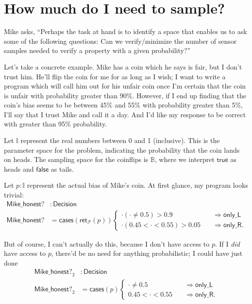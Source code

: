 \documentclass{article}           %
\newcommand{\bool}{\mathbb{B}}
\newcommand{\Prob}{\mathcal{P}}
\newcommand{\ret}[1]{\mathsf{ret}_{#1}}
\begin{document}
\section{How much do I need to sample?}

Mike asks, ``Perhaps the task at hand is to identify a space that enables us to ask
some of the following questions: Can we verify/minimize the number of sensor samples needed to verify a property with a given probability?''

Let's take a concrete example. Mike has a coin which he says is fair, but I don't trust him. He'll flip the coin for me for as long as I wish; I want to write a program which will call him out for his unfair coin once I'm certain that the coin is unfair with probability greater than 90\%. However, if I end up finding that the coin's bias seems to be between 45\% and 55\% with probability greater than 5\%, I'll say that I trust Mike and call it a day. And I'd like my response to be correct with greater than 95\% probability.

Let $\mathbb{I}$ represent the real numbers between 0 and 1 (inclusive). This is the parameter space for the problem, indicating the probability that the coin lands on heads. The sampling space for the coinflips is $\bool$, where we interpret $\mathsf{true}$ as heads and $\mathsf{false}$ as tails.

Let $p : \mathbb{I}$ represent the actual bias of Mike's coin. At first glance, my program looks trivial:
\begin{align*}
\mathsf{Mike\_honest?} &: \mathsf{Decision}
\\ \mathsf{Mike\_honest?} &= \mathsf{cases}(\ret{\Prob}(p))
\begin{cases}
\cdot(\cdot \ne 0.5) > 0.9
  \quad &\Longrightarrow
   \mathsf{only\_L}
\\
\cdot(0.45 < \cdot < 0.55) > 0.05
  \quad &\Longrightarrow
   \mathsf{only\_R}.
\end{cases}
\end{align*}

But of course, I can't actually do this, because I don't have access to $p$. If I \emph{did} have access to $p$, there'd be no need for anything probabilistic; I could have just done
\begin{align*}
\mathsf{Mike\_honest?}_2 &: \mathsf{Decision}
\\ \mathsf{Mike\_honest?}_2 &= \mathsf{cases}(p)
\begin{cases}
\cdot \ne 0.5 
  \quad &\Longrightarrow
   \mathsf{only\_L}
\\
0.45 < \cdot < 0.55
  \quad &\Longrightarrow
   \mathsf{only\_R}.
\end{cases}
\end{align*}
\end{document}

